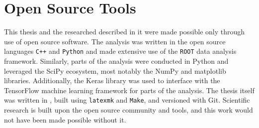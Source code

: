 

\section{Open Source Tools}\label{section:open_source}

This thesis and the researched described in it were made possible only through use of open source software.
The analysis was written in the open source languages \texttt{C++} and \texttt{Python} and made extensive use of the \texttt{ROOT} data analysis framework.
Similarly, parts of the analysis were conducted in Python and leveraged the SciPy ecosystem, most notably the NumPy and matplotlib libraries.
Additionally, the Keras library was used to interface with the TensorFlow machine learning framework for parts of the analysis.
The thesis itself was written in \LaTeXe, built using \texttt{latexmk} and \texttt{Make}, and versioned with Git.
Scientific research is built upon the open source community and tools, and this work would not have been made possible without it.
